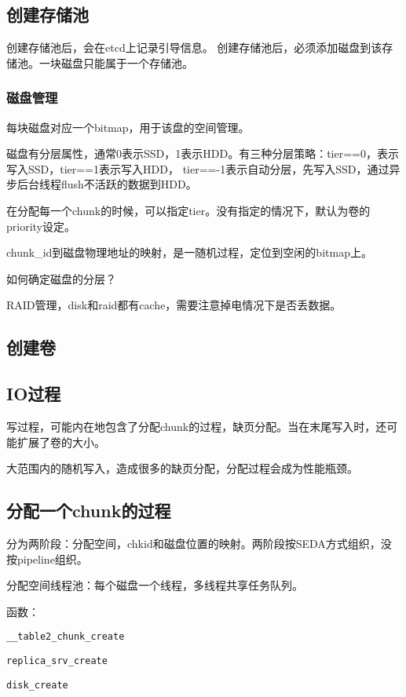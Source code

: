 \subsection{创建存储池}

创建存储池后，会在etcd上记录引导信息。
创建存储池后，必须添加磁盘到该存储池。一块磁盘只能属于一个存储池。

\subsubsection{磁盘管理}

每块磁盘对应一个bitmap，用于该盘的空间管理。

磁盘有分层属性，通常0表示SSD，1表示HDD。有三种分层策略：tier==0，表示写入SSD，tier==1表示写入HDD，
tier==-1表示自动分层，先写入SSD，通过异步后台线程flush不活跃的数据到HDD。

在分配每一个chunk的时候，可以指定tier。没有指定的情况下，默认为卷的priority设定。

chunk\_id到磁盘物理地址的映射，是一随机过程，定位到空闲的bitmap上。

如何确定磁盘的分层？

RAID管理，disk和raid都有cache，需要注意掉电情况下是否丢数据。

\subsection{创建卷}

\subsection{IO过程}

写过程，可能内在地包含了分配chunk的过程，缺页分配。当在末尾写入时，还可能扩展了卷的大小。

大范围内的随机写入，造成很多的缺页分配，分配过程会成为性能瓶颈。

\subsection{分配一个chunk的过程}

分为两阶段：分配空间，chkid和磁盘位置的映射。两阶段按SEDA方式组织，没按pipeline组织。

分配空间线程池：每个磁盘一个线程，多线程共享任务队列。


函数：
\begin{compactitem}
\item \verb|__table2_chunk_create|
\item \verb|replica_srv_create|
\item \verb|disk_create|
\end{compactitem}


